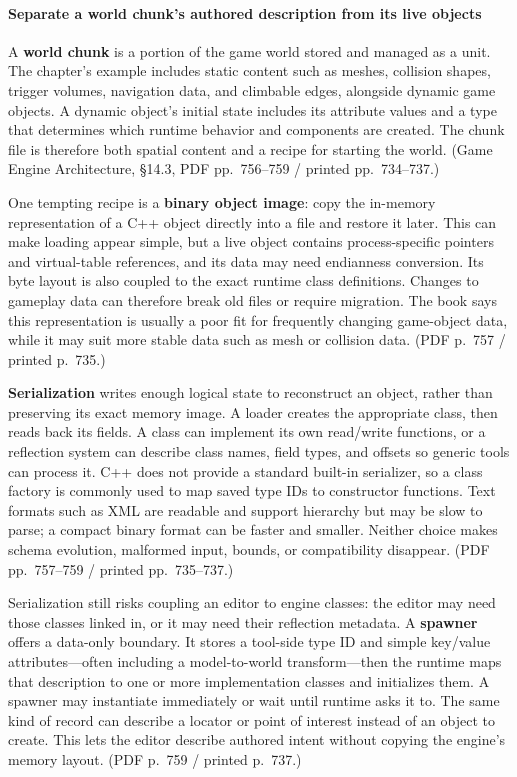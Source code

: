 \paragraph{Separate a world chunk's authored description from its live objects}\label{06-engine-ii-ch032-separate-a-world-chunks-authored-description-from-its-live-objects}

A \textbf{world chunk} is a portion of the game world stored and managed as a unit. The chapter's example includes static content such as meshes, collision shapes, trigger volumes, navigation data, and climbable edges, alongside dynamic game objects. A dynamic object's initial state includes its attribute values and a type that determines which runtime behavior and components are created. The chunk file is therefore both spatial content and a recipe for starting the world. (Game Engine Architecture, §14.3, PDF pp.~756--759 / printed pp.~734--737.)

One tempting recipe is a \textbf{binary object image}: copy the in-memory representation of a C++ object directly into a file and restore it later. This can make loading appear simple, but a live object contains process-specific pointers and virtual-table references, and its data may need endianness conversion. Its byte layout is also coupled to the exact runtime class definitions. Changes to gameplay data can therefore break old files or require migration. The book says this representation is usually a poor fit for frequently changing game-object data, while it may suit more stable data such as mesh or collision data. (PDF p.~757 / printed p.~735.)

\textbf{Serialization} writes enough logical state to reconstruct an object, rather than preserving its exact memory image. A loader creates the appropriate class, then reads back its fields. A class can implement its own read/write functions, or a reflection system can describe class names, field types, and offsets so generic tools can process it. C++ does not provide a standard built-in serializer, so a class factory is commonly used to map saved type IDs to constructor functions. Text formats such as XML are readable and support hierarchy but may be slow to parse; a compact binary format can be faster and smaller. Neither choice makes schema evolution, malformed input, bounds, or compatibility disappear. (PDF pp.~757--759 / printed pp.~735--737.)

Serialization still risks coupling an editor to engine classes: the editor may need those classes linked in, or it may need their reflection metadata. A \textbf{spawner} offers a data-only boundary. It stores a tool-side type ID and simple key/value attributes---often including a model-to-world transform---then the runtime maps that description to one or more implementation classes and initializes them. A spawner may instantiate immediately or wait until runtime asks it to. The same kind of record can describe a locator or point of interest instead of an object to create. This lets the editor describe authored intent without copying the engine's memory layout. (PDF p.~759 / printed p.~737.)

